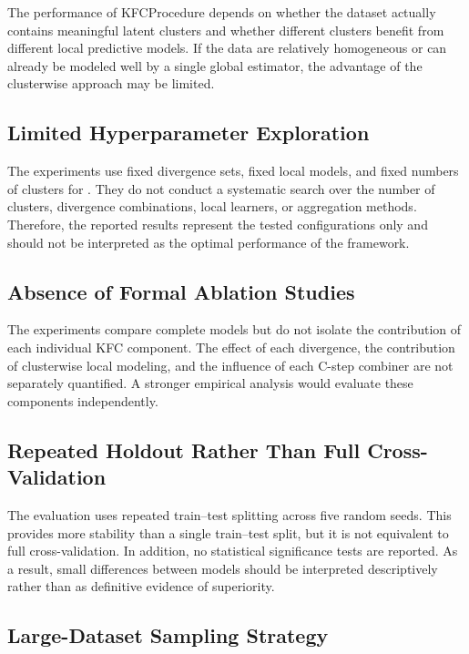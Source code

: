 \hs The performance of KFCProcedure depends on whether the dataset actually contains meaningful latent clusters and whether different clusters benefit from different local predictive models. If the data are relatively homogeneous or can already be modeled well by a single global estimator, the advantage of the clusterwise approach may be limited.


\subsection{Limited Hyperparameter Exploration}

\hs The experiments use fixed divergence sets, fixed local models, and fixed numbers of clusters for \KFCProcedure{}. They do not conduct a systematic search over the number of clusters, divergence combinations, local learners, or aggregation methods. Therefore, the reported results represent the tested configurations only and should not be interpreted as the optimal performance of the framework.

\subsection{Absence of Formal Ablation Studies}

\hs The experiments compare complete models but do not isolate the contribution of each individual KFC component. The effect of each divergence, the contribution of clusterwise local modeling, and the influence of each C-step combiner are not separately quantified. A stronger empirical analysis would evaluate these components independently.

\subsection{Repeated Holdout Rather Than Full Cross-Validation}

\hs The evaluation uses repeated train--test splitting across five random seeds. This provides more stability than a single train--test split, but it is not equivalent to full cross-validation. In addition, no statistical significance tests are reported. As a result, small differences between models should be interpreted descriptively rather than as definitive evidence of superiority.

\subsection{Large-Dataset Sampling Strategy}

